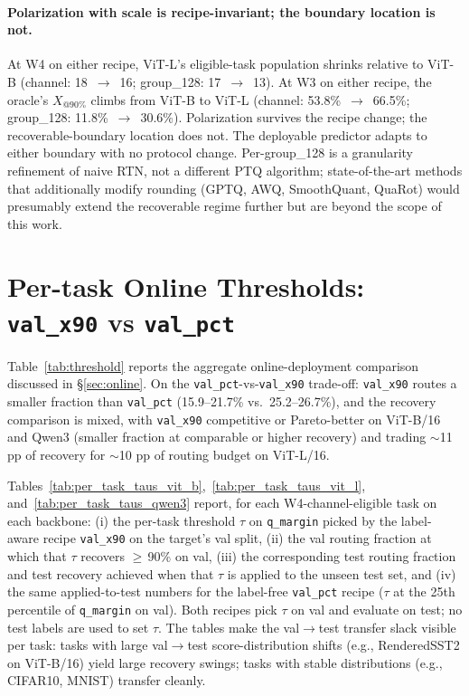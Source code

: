 \documentclass{article}
\makeatletter
\newcommand{\ptq}{\textsc{PTQ}\xspace}
\newcommand{\xat}[1]{\ensuremath{X_{@#1\%}}}
\makeatother
\begin{document}
\paragraph{Polarization with scale is recipe-invariant; the boundary location is not.}
At W4 on either recipe, ViT-L's eligible-task population shrinks relative to ViT-B (channel: 18~$\to$~16; group\_128: 17~$\to$~13). At W3 on either recipe, the oracle's \xat{90} climbs from ViT-B to ViT-L (channel: 53.8\%~$\to$~66.5\%; group\_128: 11.8\%~$\to$~30.6\%). Polarization survives the recipe change; the recoverable-boundary location does not. The deployable predictor adapts to either boundary with no protocol change. Per-group\_128 is a granularity refinement of naive RTN, not a different \ptq{} algorithm; state-of-the-art methods that additionally modify rounding (GPTQ, AWQ, SmoothQuant, QuaRot) would presumably extend the recoverable regime further but are beyond the scope of this work.

\section{Per-task Online Thresholds: \texttt{val\_x90} vs \texttt{val\_pct}}\label{app:per_task_taus}

Table~\ref{tab:threshold} reports the aggregate online-deployment comparison discussed in \S\ref{sec:online}. On the \texttt{val\_pct}-vs-\texttt{val\_x90} trade-off: \texttt{val\_x90} routes a smaller fraction than \texttt{val\_pct} (15.9--21.7\% vs.\ 25.2--26.7\%), and the recovery comparison is mixed, with \texttt{val\_x90} competitive or Pareto-better on ViT-B/16 and Qwen3 (smaller fraction at comparable or higher recovery) and trading $\sim$11 pp of recovery for $\sim$10 pp of routing budget on ViT-L/16.



Tables~\ref{tab:per_task_taus_vit_b},~\ref{tab:per_task_taus_vit_l}, and~\ref{tab:per_task_taus_qwen3} report, for each W4-channel-eligible task on each backbone: (i) the per-task threshold $\tau$ on \texttt{q\_margin} picked by the label-aware recipe \texttt{val\_x90} on the target's val split, (ii) the val routing fraction at which that $\tau$ recovers $\geq$\,90\% on val, (iii) the corresponding test routing fraction and test recovery achieved when that $\tau$ is applied to the unseen test set, and (iv) the same applied-to-test numbers for the label-free \texttt{val\_pct} recipe ($\tau$ at the 25th percentile of \texttt{q\_margin} on val). Both recipes pick $\tau$ on val and evaluate on test; no test labels are used to set $\tau$. The tables make the val$\to$test transfer slack visible per task: tasks with large val$\to$test score-distribution shifts (e.g., RenderedSST2 on ViT-B/16) yield large recovery swings; tasks with stable distributions (e.g., CIFAR10, MNIST) transfer cleanly.
\end{document}
